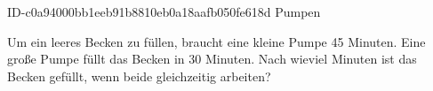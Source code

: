\begin{exercise}
      {ID-c0a94000bb1eeb91b8810eb0a18aafb050fe618d}
      {Pumpen}
  \ifproblem\problem\par
    Um ein leeres Becken zu füllen, braucht eine kleine Pumpe 45 Minuten.
    Eine große Pumpe füllt das Becken in 30 Minuten. Nach wieviel Minuten
    ist das Becken gefüllt, wenn beide gleichzeitig arbeiten?
  \fi
\end{exercise}
